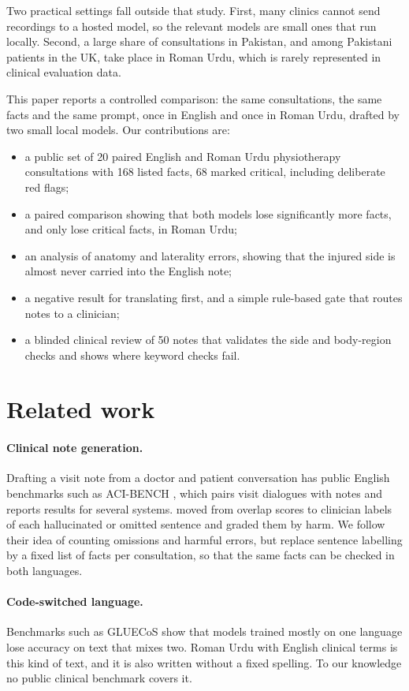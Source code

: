 \documentclass[11pt]{article}
\begin{document}
Two practical settings fall outside that study. First, many clinics cannot send recordings to a hosted model, so the relevant models are small ones that run locally. Second, a large share of consultations in Pakistan, and among Pakistani patients in the UK, take place in Roman Urdu, which is rarely represented in clinical evaluation data.

This paper reports a controlled comparison: the same consultations, the same facts and the same prompt, once in English and once in Roman Urdu, drafted by two small local models. Our contributions are:
\begin{itemize}
  \item a public set of 20 paired English and Roman Urdu physiotherapy consultations with 168 listed facts, 68 marked critical, including deliberate red flags;
  \item a paired comparison showing that both models lose significantly more facts, and only lose critical facts, in Roman Urdu;
  \item an analysis of anatomy and laterality errors, showing that the injured side is almost never carried into the English note;
  \item a negative result for translating first, and a simple rule-based gate that routes notes to a clinician;
  \item a blinded clinical review of 50 notes that validates the side and body-region checks and shows where keyword checks fail.
\end{itemize}

\section{Related work}
\paragraph{Clinical note generation.} Drafting a visit note from a doctor and patient conversation has public English benchmarks such as ACI-BENCH \citep{yim2023acibench}, which pairs visit dialogues with notes and reports results for several systems. \citet{asgari2025framework} moved from overlap scores to clinician labels of each hallucinated or omitted sentence and graded them by harm. We follow their idea of counting omissions and harmful errors, but replace sentence labelling by a fixed list of facts per consultation, so that the same facts can be checked in both languages.

\paragraph{Code-switched language.} Benchmarks such as GLUECoS \citep{khanuja2020gluecos} show that models trained mostly on one language lose accuracy on text that mixes two. Roman Urdu with English clinical terms is this kind of text, and it is also written without a fixed spelling. To our knowledge no public clinical benchmark covers it.
\end{document}
